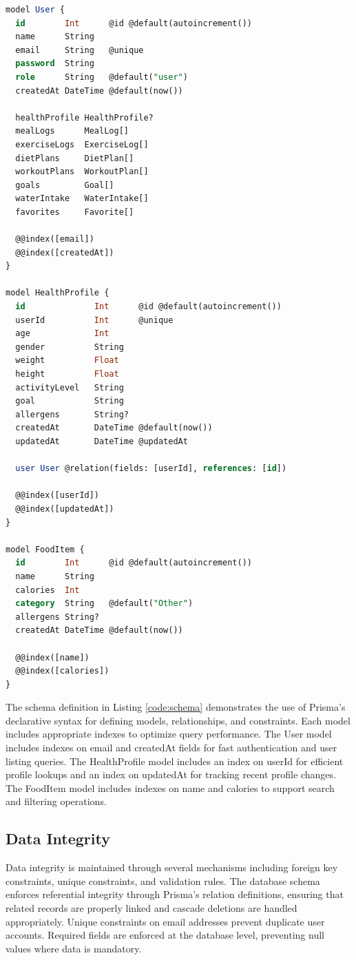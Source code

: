\begin{lstlisting}[language=SQL, caption=Prisma Database Schema (Excerpt), label=code:schema]
model User {
  id        Int      @id @default(autoincrement())
  name      String
  email     String   @unique
  password  String
  role      String   @default("user")
  createdAt DateTime @default(now())
  
  healthProfile HealthProfile?
  mealLogs      MealLog[]
  exerciseLogs  ExerciseLog[]
  dietPlans     DietPlan[]
  workoutPlans  WorkoutPlan[]
  goals         Goal[]
  waterIntake   WaterIntake[]
  favorites     Favorite[]
  
  @@index([email])
  @@index([createdAt])
}

model HealthProfile {
  id              Int      @id @default(autoincrement())
  userId          Int      @unique
  age             Int
  gender          String
  weight          Float
  height          Float
  activityLevel   String
  goal            String
  allergens       String?
  createdAt       DateTime @default(now())
  updatedAt       DateTime @updatedAt
  
  user User @relation(fields: [userId], references: [id])
  
  @@index([userId])
  @@index([updatedAt])
}

model FoodItem {
  id        Int      @id @default(autoincrement())
  name      String
  calories  Int
  category  String   @default("Other")
  allergens String?
  createdAt DateTime @default(now())
  
  @@index([name])
  @@index([calories])
}
\end{lstlisting}

The schema definition in Listing \ref{code:schema} demonstrates the use of Prisma's declarative syntax for defining models, relationships, and constraints. Each model includes appropriate indexes to optimize query performance. The User model includes indexes on email and createdAt fields for fast authentication and user listing queries. The HealthProfile model includes an index on userId for efficient profile lookups and an index on updatedAt for tracking recent profile changes. The FoodItem model includes indexes on name and calories to support search and filtering operations.

\subsection{Data Integrity}

Data integrity is maintained through several mechanisms including foreign key constraints, unique constraints, and validation rules. The database schema enforces referential integrity through Prisma's relation definitions, ensuring that related records are properly linked and cascade deletions are handled appropriately. Unique constraints on email addresses prevent duplicate user accounts. Required fields are enforced at the database level, preventing null values where data is mandatory.

